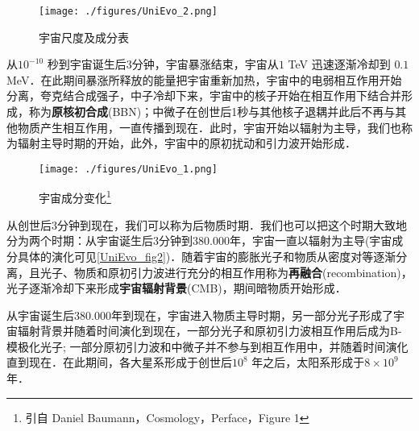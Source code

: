 \begin{figure}[ht]
\centering
\texttt{[image: ./figures/UniEvo\_2.png]}
\caption{宇宙尺度及成分表} \label{UniEvo_fig1}
\end{figure}

从$10^{-10}$ 秒到宇宙诞生后3分钟，宇宙暴涨结束，宇宙从$1$ TeV 迅速逐渐冷却到 $0.1 $ MeV．在此期间暴涨所释放的能量把宇宙重新加热，宇宙中的电弱相互作用开始分离，夸克结合成强子，中子冷却下来，宇宙中的核子开始在相互作用下结合并形成，称为\textbf{原核初合成}(BBN)；中微子在创世后1秒与其他核子退耦并此后不再与其他物质产生相互作用，一直传播到现在．此时，宇宙开始以辐射为主导，我们也称为辐射主导时期的开始，此外，宇宙中的原初扰动和引力波开始形成．

\begin{figure}[ht]
\centering
\texttt{[image: ./figures/UniEvo\_1.png]}
\caption{宇宙成分变化\footnote{引自 Daniel Baumann，Cosmology，Perface，Figure 1}} \label{UniEvo_fig2}
\end{figure}

从创世后3分钟到现在，我们可以称为后物质时期．我们也可以把这个时期大致地分为两个时期：从宇宙诞生后3分钟到380.000年，宇宙一直以辐射为主导(宇宙成分具体的演化可见\autoref{UniEvo_fig2})．随着宇宙的膨胀光子和物质从密度对等逐渐分离，且光子、物质和原初引力波进行充分的相互作用称为\textbf{再融合}(recombination)，光子逐渐冷却下来形成\textbf{宇宙辐射背景}(CMB)，期间暗物质开始形成．

从宇宙诞生后380.000年到现在，宇宙进入物质主导时期，另一部分光子形成了宇宙辐射背景并随着时间演化到现在，一部分光子和原初引力波相互作用后成为B-模极化光子; 一部分原初引力波和中微子并不参与到相互作用中，并随着时间演化直到现在．在此期间，各大星系形成于创世后$10^8$ 年之后，太阳系形成于$8\times 10^9$年．




